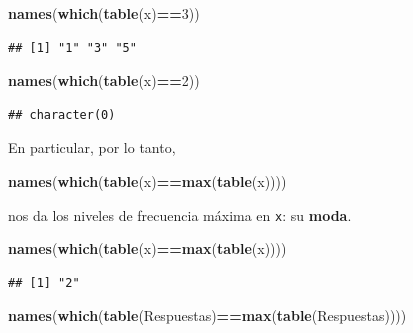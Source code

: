 \documentclass[]{book}
\newenvironment{Shaded}{\begin{snugshade}}{\end{snugshade}}
\newcommand{\DecValTok}[1]{\textcolor[rgb]{0.00,0.00,0.81}{#1}}
\newcommand{\KeywordTok}[1]{\textcolor[rgb]{0.13,0.29,0.53}{\textbf{#1}}}
\newcommand{\NormalTok}[1]{#1}
\newcommand{\OperatorTok}[1]{\textcolor[rgb]{0.81,0.36,0.00}{\textbf{#1}}}
\theoremstyle{definition}
\theoremstyle{definition}
\theoremstyle{definition}
\theoremstyle{remark}
\begin{document}
\begin{Shaded}
\begin{Highlighting}[]
\KeywordTok{names}\NormalTok{(}\KeywordTok{which}\NormalTok{(}\KeywordTok{table}\NormalTok{(x)}\OperatorTok{==}\DecValTok{3}\NormalTok{))}
\end{Highlighting}
\end{Shaded}

\begin{verbatim}
## [1] "1" "3" "5"
\end{verbatim}

\begin{Shaded}
\begin{Highlighting}[]
\KeywordTok{names}\NormalTok{(}\KeywordTok{which}\NormalTok{(}\KeywordTok{table}\NormalTok{(x)}\OperatorTok{==}\DecValTok{2}\NormalTok{))}
\end{Highlighting}
\end{Shaded}

\begin{verbatim}
## character(0)
\end{verbatim}

En particular, por lo tanto,

\begin{Shaded}
\begin{Highlighting}[]
\KeywordTok{names}\NormalTok{(}\KeywordTok{which}\NormalTok{(}\KeywordTok{table}\NormalTok{(x)}\OperatorTok{==}\KeywordTok{max}\NormalTok{(}\KeywordTok{table}\NormalTok{(x))))}
\end{Highlighting}
\end{Shaded}

nos da los niveles de frecuencia máxima en \texttt{x}: su \textbf{moda}.

\begin{Shaded}
\begin{Highlighting}[]
\KeywordTok{names}\NormalTok{(}\KeywordTok{which}\NormalTok{(}\KeywordTok{table}\NormalTok{(x)}\OperatorTok{==}\KeywordTok{max}\NormalTok{(}\KeywordTok{table}\NormalTok{(x))))}
\end{Highlighting}
\end{Shaded}

\begin{verbatim}
## [1] "2"
\end{verbatim}

\begin{Shaded}
\begin{Highlighting}[]
\KeywordTok{names}\NormalTok{(}\KeywordTok{which}\NormalTok{(}\KeywordTok{table}\NormalTok{(Respuestas)}\OperatorTok{==}\KeywordTok{max}\NormalTok{(}\KeywordTok{table}\NormalTok{(Respuestas))))}
\end{Highlighting}
\end{Shaded}
\end{document}
